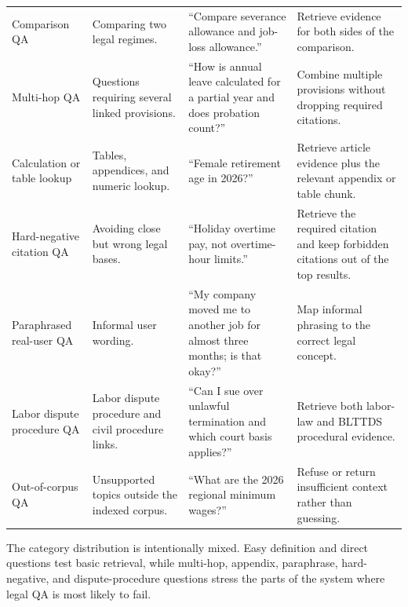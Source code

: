 \begin{longtable}{@{}L{0.19\textwidth}L{0.24\textwidth}L{0.27\textwidth}L{0.22\textwidth}@{}}
Comparison QA & Comparing two legal regimes. & ``Compare severance allowance and job-loss allowance.'' & Retrieve evidence for both sides of the comparison. \\
Multi-hop QA & Questions requiring several linked provisions. & ``How is annual leave calculated for a partial year and does probation count?'' & Combine multiple provisions without dropping required citations. \\
Calculation or table lookup & Tables, appendices, and numeric lookup. & ``Female retirement age in 2026?'' & Retrieve article evidence plus the relevant appendix or table chunk. \\
Hard-negative citation QA & Avoiding close but wrong legal bases. & ``Holiday overtime pay, not overtime-hour limits.'' & Retrieve the required citation and keep forbidden citations out of the top results. \\
Paraphrased real-user QA & Informal user wording. & ``My company moved me to another job for almost three months; is that okay?'' & Map informal phrasing to the correct legal concept. \\
Labor dispute procedure QA & Labor dispute procedure and civil procedure links. & ``Can I sue over unlawful termination and which court basis applies?'' & Retrieve both labor-law and BLTTDS procedural evidence. \\
Out-of-corpus QA & Unsupported topics outside the indexed corpus. & ``What are the 2026 regional minimum wages?'' & Refuse or return insufficient context rather than guessing. \\
\end{longtable}
\endgroup

The category distribution is intentionally mixed. Easy definition and direct
questions test basic retrieval, while multi-hop, appendix, paraphrase,
hard-negative, and dispute-procedure questions stress the parts of the system
where legal QA is most likely to fail.
